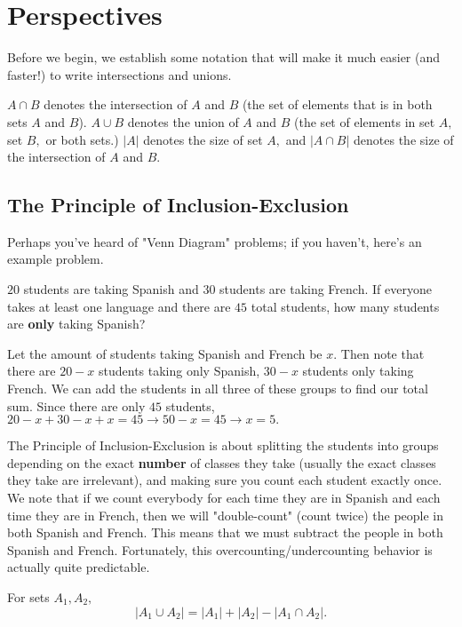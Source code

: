 \documentclass[blue,onecol]{shooting}
\begin{document}
\chapter{Perspectives}
Before we begin, we establish some notation that will make it much easier (and faster!) to write intersections and unions.

$A\cap B$ denotes the intersection of $A$ and $B$ (the set of elements that is in both sets $A$ and $B$). $A\cup B$ denotes the union of $A$ and $B$ (the set of elements in set $A,$ set $B,$ or both sets.) $|A|$ denotes the size of set $A,$ and $|A\cap B|$ denotes the size of the intersection of $A$ and $B.$

\section{The Principle of Inclusion-Exclusion}

Perhaps you've heard of "Venn Diagram" problems; if you haven't, here's an example problem.

\begin{exam}
$20$ students are taking Spanish and $30$ students are taking French. If everyone takes at least one language and there are $45$ total students, how many students are \textbf{only} taking Spanish?
\end{exam}

\begin{sol}
Let the amount of students taking Spanish and French be $x.$ Then note that there are $20-x$ students taking only Spanish, $30-x$ students only taking French. We can add the students in all three of these groups to find our total sum. Since there are only $45$ students, $20-x+30-x+x=45\to 50-x=45\to x=5.$
\end{sol}

The Principle of Inclusion-Exclusion is about splitting the students into groups depending on the exact \textbf{number} of classes they take (usually the exact classes they take are irrelevant), and making sure you count each student exactly once. We note that if we count everybody for each time they are in Spanish and each time they are in French, then we will "double-count" (count twice) the people in both Spanish and French. This means that we must subtract the people in both Spanish and French. Fortunately, this overcounting/undercounting behavior is actually quite predictable.

\begin{theo}
For sets $A_1,A_2,$
\[|A_1\cup A_2|=|A_1|+|A_2|-|A_1\cap A_2|.\]
\end{theo}
\end{document}
